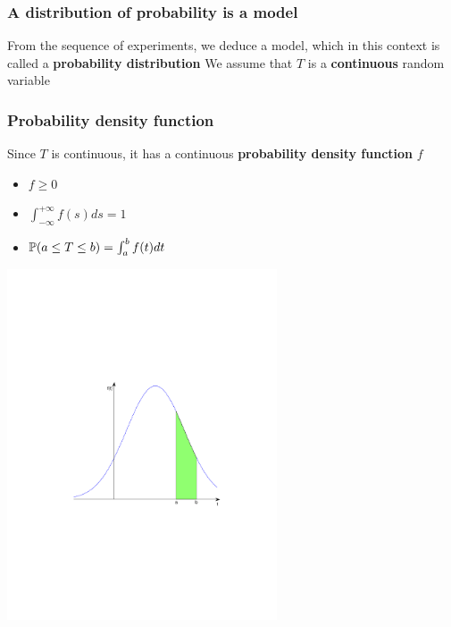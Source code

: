 \documentclass[aspectratio=43]{beamer}
\begin{document}

\begin{frame}\frametitle{A distribution of probability is a model}
From the sequence of experiments, we deduce a model, which in this context is called a \textbf{probability distribution}
\vfill
We assume that $T$ is a \textbf{continuous} random variable
\end{frame}


\begin{frame}\frametitle{Probability density function}
Since $T$ is continuous, it has a continuous \textbf{probability density
function} $f$
\begin{itemize}
\item $f\geq 0$
\item $\int_{-\infty}^{+\infty}f(s)ds=1$
\item $\mathbb{P}(a\leq T\leq b)=\int_a^bf(t)dt$
\end{itemize}
\begin{center}
\includegraphics[width=0.6\textwidth]{FIGS/distrib_a_b}
\end{center}
\end{frame}
\end{document}
